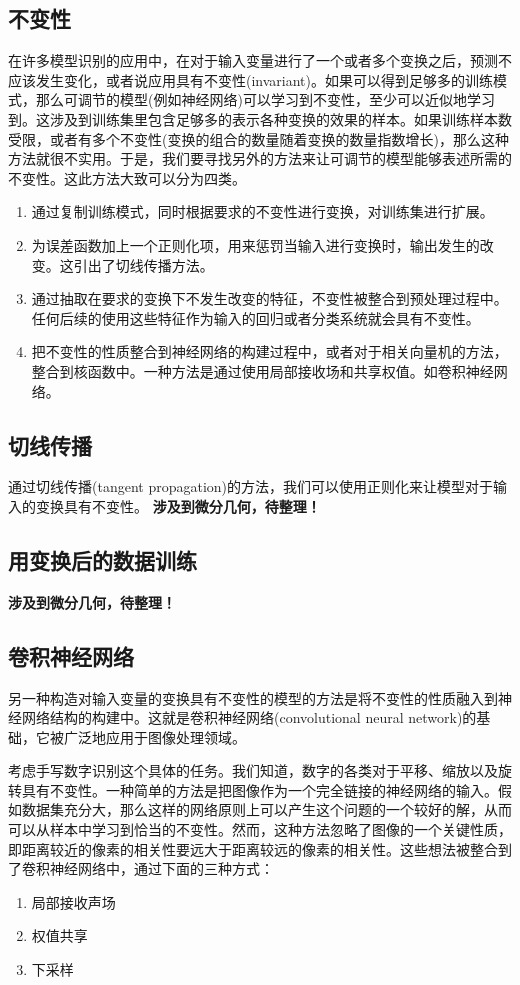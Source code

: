 \subsection*{不变性}
在许多模型识别的应用中，在对于输入变量进行了一个或者多个变换之后，预测不应该发生变化，或者说应用具有不变性(invariant)。如果可以得到足够多的训练模式，那么可调节的模型(例如神经网络)可以学习到不变性，至少可以近似地学习到。这涉及到训练集里包含足够多的表示各种变换的效果的样本。如果训练样本数受限，或者有多个不变性(变换的组合的数量随着变换的数量指数增长)，那么这种方法就很不实用。于是，我们要寻找另外的方法来让可调节的模型能够表述所需的不变性。这此方法大致可以分为四类。
\begin{enumerate}
	\item 通过复制训练模式，同时根据要求的不变性进行变换，对训练集进行扩展。
	\item 为误差函数加上一个正则化项，用来惩罚当输入进行变换时，输出发生的改变。这引出了切线传播方法。
	\item 通过抽取在要求的变换下不发生改变的特征，不变性被整合到预处理过程中。任何后续的使用这些特征作为输入的回归或者分类系统就会具有不变性。
	\item 把不变性的性质整合到神经网络的构建过程中，或者对于相关向量机的方法，整合到核函数中。一种方法是通过使用局部接收场和共享权值。如卷积神经网络。
\end{enumerate}
\subsection*{切线传播}
通过切线传播(tangent propagation)的方法，我们可以使用正则化来让模型对于输入的变换具有不变性。
\textbf{涉及到微分几何，待整理！}
\subsection*{用变换后的数据训练}
\textbf{涉及到微分几何，待整理！}
\subsection*{卷积神经网络}
另一种构造对输入变量的变换具有不变性的模型的方法是将不变性的性质融入到神经网络结构的构建中。这就是卷积神经网络(convolutional neural network)的基础，它被广泛地应用于图像处理领域。

考虑手写数字识别这个具体的任务。我们知道，数字的各类对于平移、缩放以及旋转具有不变性。一种简单的方法是把图像作为一个完全链接的神经网络的输入。假如数据集充分大，那么这样的网络原则上可以产生这个问题的一个较好的解，从而可以从样本中学习到恰当的不变性。然而，这种方法忽略了图像的一个关键性质，即距离较近的像素的相关性要远大于距离较远的像素的相关性。这些想法被整合到了卷积神经网络中，通过下面的三种方式：
\begin{enumerate}[(1)]
	\item 局部接收声场
	\item 权值共享
	\item 下采样
\end{enumerate}
